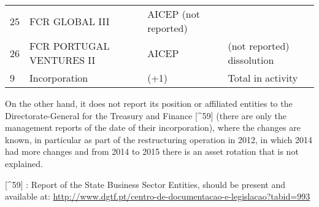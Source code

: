 \documentclass[]{book}
\theoremstyle{definition}
\theoremstyle{definition}
\theoremstyle{definition}
\theoremstyle{remark}
\begin{document}
\begin{longtable}[]{@{}llll@{}}
\begin{minipage}[t]{0.17\columnwidth}\raggedright\strut
25\strut
\end{minipage} & \begin{minipage}[t]{0.17\columnwidth}\raggedright\strut
FCR GLOBAL III\strut
\end{minipage} & \begin{minipage}[t]{0.17\columnwidth}\raggedright\strut
AICEP (not reported)\strut
\end{minipage}\tabularnewline
\begin{minipage}[t]{0.17\columnwidth}\raggedright\strut
26\strut
\end{minipage} & \begin{minipage}[t]{0.17\columnwidth}\raggedright\strut
FCR PORTUGAL VENTURES II\strut
\end{minipage} & \begin{minipage}[t]{0.17\columnwidth}\raggedright\strut
AICEP\strut
\end{minipage} & \begin{minipage}[t]{0.17\columnwidth}\raggedright\strut
(not reported) dissolution\strut
\end{minipage}\tabularnewline
\begin{minipage}[t]{0.17\columnwidth}\raggedright\strut
9\strut
\end{minipage} & \begin{minipage}[t]{0.17\columnwidth}\raggedright\strut
Incorporation\strut
\end{minipage} & \begin{minipage}[t]{0.17\columnwidth}\raggedright\strut
(+1)\strut
\end{minipage} & \begin{minipage}[t]{0.17\columnwidth}\raggedright\strut
Total in activity\strut
\end{minipage}\tabularnewline
\bottomrule
\end{longtable}

On the other hand, it does not report its position or affiliated
entities to the Directorate-General for the Treasury and Finance
{[}\^{}59{]} (there are only the management reports of the date of their
incorporation), where the changes are known, in particular as part of
the restructuring operation in 2012, in which 2014 had more changes and
from 2014 to 2015 there is an asset rotation that is not explained.

{[}\^{}59{]} : Report of the State Business Sector Entities, should be
present and available at:
\url{http://www.dgtf.pt/centro-de-documentacao-e-legislacao?tabid=993}
\end{document}
